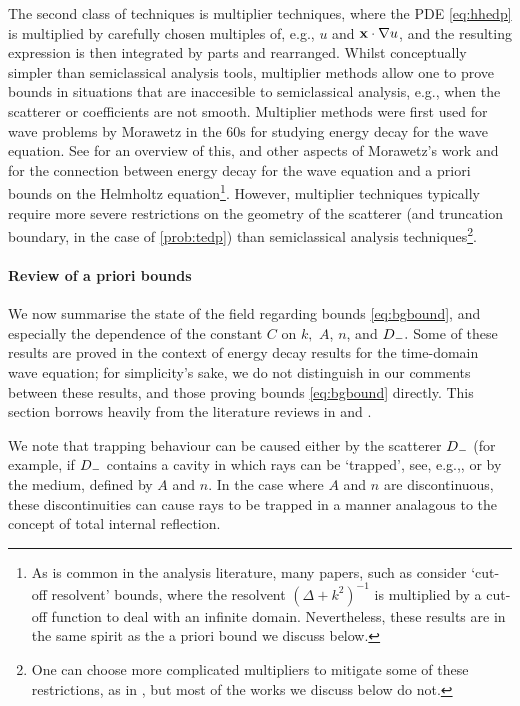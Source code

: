The second class of techniques is multiplier techniques, where the PDE \eqref{eq:hhedp} is multiplied by carefully chosen multiples of, e.g.,  $u$ and $\mathbf{x}\cdot\nabla u$, and the resulting expression is then integrated by parts and rearranged. Whilst conceptually simpler than semiclassical analysis tools, multiplier methods allow one to prove bounds in situations that are inaccesible to semiclassical analysis, e.g., when the scatterer or coefficients are not smooth. Multiplier methods were first used for wave problems by Morawetz in the 60s for studying  energy decay for the wave equation. See \cite{GaGrPaSaSoTa:18} for an overview of this, and other aspects of Morawetz's work and \cite[Theorem 1.1]{Vo:99} for the connection between energy decay for the wave equation and a priori bounds on the Helmholtz equation\footnote{As is common in the analysis literature, many papers, such as \cite{Vo:99} consider `cut-off resolvent' bounds, where the resolvent $(\Delta + k^2)^{-1}$ is multiplied by a cut-off function to deal with an infinite domain. Nevertheless, these results are in the same spirit as the a priori bound we discuss below.}. However, multiplier techniques typically require more severe restrictions on the geometry of the scatterer (and truncation boundary, in the case of \cref{prob:tedp}) than semiclassical analysis techniques\footnote{One can choose more complicated multipliers to mitigate some of these restrictions, as in \cite{MoRaSt:77}, but most of the works we discuss below do not.}.

\paragraph{Review of a priori bounds} We now summarise the state of the field regarding bounds \eqref{eq:bgbound}, and especially the dependence of the constant $C$ on $k,$ $A$, $n$, and $D_{-}.$ Some of these results are proved in the context of energy decay results for the time-domain wave equation; for simplicity's sake, we do not distinguish in our comments between these results, and those proving bounds \eqref{eq:bgbound} directly. This section borrows heavily from the literature reviews in \cite[Section 1.1]{ChSpGiSm:17} and \cite[Sections 1 and 2.4]{GrPeSp:19}.

We note that trapping behaviour can be caused either by the scatterer $D_{-}$ (for example, if $D_{-}$ contains a cavity in which rays can be `trapped', see, e.g.,, or by the medium, defined by $A$ and $n$. In the case where $A$ and $n$ are discontinuous, these discontinuities can cause rays to be trapped in a manner analagous to the concept of total internal reflection.

